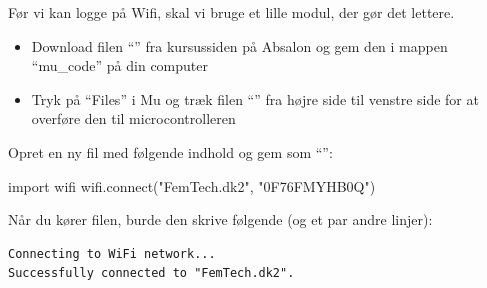 \documentclass{ucph-handout}
\newcounter{handout}
\newcommand{\Ark}{Arbejdsark \arabic{handout}: }
\renewcommand{\Title}{\Ark LED-strip}%
\begin{document}

\newpage
{}
\renewcommand{\Title}{\Ark Internetforbindelse}
\begin{exercisebox}[adjusted title=Overfør wifi-modul]
Før vi kan logge på Wifi, skal vi bruge et lille modul, der gør det lettere.
\begin{itemize}
\item Download filen ``'' fra kursussiden på
  Absalon og gem den i mappen ``mu\_code'' på din computer
\item Tryk på ``Files'' i Mu og træk filen ``'' fra højre side til venstre side for at
    overføre den til microcontrolleren
\end{itemize}
\end{exercisebox}

\begin{exercisebox}[adjusted title=Forbind til WiFi]
\vspace{-2mm}
Opret en ny fil med følgende indhold og gem som ``'':
\begin{python}
import wifi
wifi.connect("FemTech.dk2", "0F76FMYHB0Q")
\end{python}

\noindent
Når du kører filen, burde den skrive følgende (og et par andre
linjer):
\begin{lstlisting}
Connecting to WiFi network...
Successfully connected to "FemTech.dk2".
\end{lstlisting}
\vspace{-4mm}
\end{exercisebox}
\end{document}

